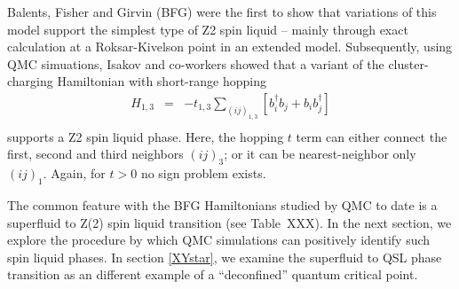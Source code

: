 \documentclass[aps,prb,groupedaddress,twocolumn]{revtex4}
\begin{document}
Balents, Fisher and Girvin\cite{BFG} (BFG) were the first to show that variations of this model support the simplest type of Z2 spin liquid -- mainly through exact calculation at a Roksar-Kivelson point in an extended model.\cite{BFG}  Subsequently, using QMC simuations, Isakov and co-workers showed that a variant of the cluster-charging Hamiltonian with short-range hopping 
\begin{eqnarray}
H_{1,3} &=& -t_{1,3} \sum_{( ij )_{1,3}} [b^{\dagger}_i b_j + b_i b^{\dagger}_j]  \\
\end{eqnarray}
supports a Z2 spin liquid phase.  Here, the hopping $t$ term can either connect the first, second and third neighbors $( ij )_3$; or it can be nearest-neighbor only $( ij )_1$.  Again, for $t>0$ no sign problem exists.




The common feature with the BFG Hamiltonians studied by QMC to date is a superfluid to Z(2) spin liquid transition (see Table~XXX).  In the next section, we explore the procedure by which QMC simulations can positively identify such spin liquid phases.  In section \ref{XYstar}, we examine the superfluid to QSL phase transition as an different example of a ``deconfined'' quantum critical point.
\end{document}
